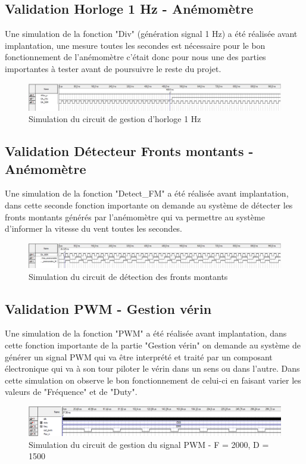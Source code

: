   \subsection{Validation Horloge 1 Hz - Anémomètre}

Une simulation de la fonction "Div" (génération signal 1 Hz) a été réalisée avant implantation, une mesure toutes les secondes est nécessaire pour le bon fonctionnement de l'anémomètre c'était donc pour nous une des parties importantes à tester avant de poursuivre le reste du projet.

\begin{figure}[h]
  \begin{center}
    \includegraphics[width=\textwidth]{images/Clk_1Hz.jpg}
    \caption{Simulation du circuit de gestion d'horloge 1 Hz}
  \end{center}
\end{figure}

\subsection{Validation Détecteur Fronts montants - Anémomètre}

Une simulation de la fonction "Detect\_FM" a été réalisée avant implantation, dans cette seconde fonction importante on demande au système de détecter les fronts montants générés par l'anémomètre qui va permettre au système d'informer la vitesse du vent toutes les secondes.

\begin{figure}[h]
  \begin{center}
    \includegraphics[width=\textwidth]{images/Detecteur_Fronts_montants.jpg}
    \caption{Simulation du circuit de détection des fronts montants}
  \end{center}
\end{figure}

\subsection{Validation PWM - Gestion vérin}

Une simulation de la fonction "PWM" a été réalisée avant implantation, dans cette fonction importante de la partie "Gestion vérin" on demande au système de générer un signal PWM qui va être interprété et traité par un composant électronique qui va à son tour piloter le vérin dans un sens ou dans l'autre. Dans cette simulation on observe le bon fonctionnement de celui-ci en faisant varier les valeurs de "Fréquence" et de "Duty".

\begin{figure}[h]
  \begin{center}
    \includegraphics[width=\textwidth]{images/pwm.png}
    \caption{Simulation du circuit de gestion du signal PWM - F = 2000, D = 1500}
  \end{center}
\end{figure}